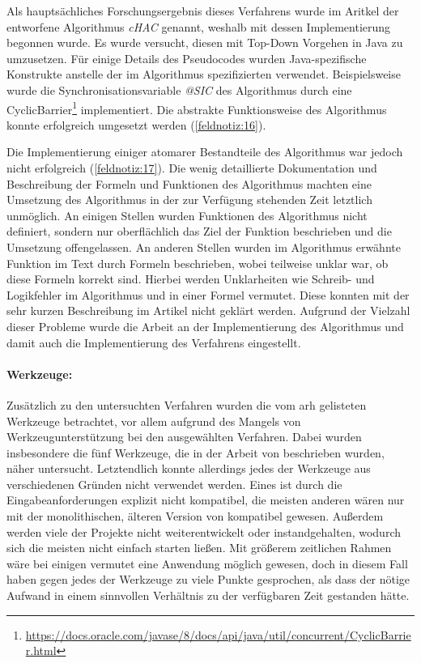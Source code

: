 Als hauptsächliches Forschungsergebnis dieses Verfahrens wurde im Aritkel der entworfene Al\-go\-rith\-mus \emph{cHAC} genannt, weshalb mit dessen Implementierung begonnen wurde.
Es wurde versucht, diesen mit Top-Down Vorgehen in Java zu umzusetzen.
Für einige Details des Pseu\-do\-codes wurden Java-spezifische Konstrukte anstelle der im Algorithmus spezifizierten verwendet.
Beispielsweise wurde die Synchronisationsvariable \emph{@SIC} des Algorithmus durch eine CyclicBarrier\footnote{\url{https://docs.oracle.com/javase/8/docs/api/java/util/concurrent/CyclicBarrier.html}} implementiert.
Die abstrakte Funktionsweise des Algorithmus konnte erfolgreich umgesetzt werden (\cref{feldnotiz:16}).

Die Implementierung einiger atomarer Bestandteile des Algorithmus war jedoch nicht erfolgreich (\cref{feldnotiz:17}).
Die wenig detaillierte Dokumentation und Beschreibung der Formeln und Funktionen des Algorithmus machten eine Umsetzung des Algorithmus in der zur Verfügung stehenden Zeit letztlich unmöglich.
An einigen Stellen wurden Funktionen des Algorithmus nicht definiert, sondern nur oberflächlich das Ziel der Funktion beschrieben und die Umsetzung offengelassen.
An anderen Stellen wurden im Algorithmus erwähnte Funktion im Text durch Formeln beschrieben, wobei teilweise unklar war, ob diese Formeln korrekt sind.
Hierbei werden Unklarheiten wie Schreib- und Logikfehler im Algorithmus und in einer Formel vermutet.
Diese konnten mit der sehr kurzen Beschreibung im Artikel nicht geklärt werden.
Aufgrund der Vielzahl dieser Probleme wurde die Arbeit an der Implementierung des Algorithmus und damit auch die Implementierung des Verfahrens eingestellt.

\paragraph{Werkzeuge:} Zusätzlich zu den untersuchten Verfahren wurden die vom \gls{arh} gelisteten Werk\-zeu\-ge betrachtet, vor allem aufgrund des Mangels von Werkzeugunterstützung bei den aus\-ge\-wähl\-ten Verfahren.
Dabei wurden insbesondere die fünf Werkzeuge, die in der Arbeit von  beschrieben wurden, näher untersucht.
Letztendlich konnte allerdings jedes der Werkzeuge aus verschiedenen Gründen nicht verwendet werden.
Eines ist durch die Eingabeanforderungen explizit nicht kompatibel, die meisten anderen wären nur mit der monolithischen, älteren Version von \jf kompatibel gewesen.
Außerdem werden viele der Projekte nicht weiterentwickelt oder instandgehalten, wodurch sich die meisten nicht einfach starten ließen.
Mit größerem zeitlichen Rahmen wäre bei einigen vermutet eine Anwendung möglich gewesen, doch in diesem Fall haben gegen jedes der Werkzeuge zu viele Punkte gesprochen, als dass der nötige Aufwand in einem sinnvollen Verhältnis zu der verfügbaren Zeit gestanden hätte.

